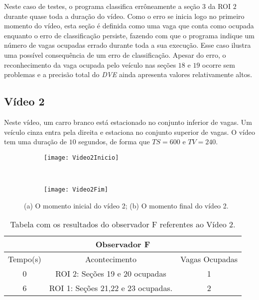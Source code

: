 Neste caso de testes, o programa classifica errôneamente a seção $3$ da ROI $2$ durante quase toda a duração do vídeo. Como o erro se inicia logo no primeiro momento do vídeo, esta seção é definida como uma vaga que conta como ocupada enquanto o erro de classificação persiste, fazendo com que o programa indique um número de vagas ocupadas errado durante toda a sua execução. Esse caso ilustra uma possível consequência de um erro de classificação. Apesar do erro, o reconhecimento da vaga ocupada pelo veículo nas seções $18$ e $19$ ocorre sem problemas e a precisão total do \textit{DVE} ainda apresenta valores relativamente altos.

\subsection{Vídeo 2}

Neste vídeo, um carro branco está estacionado no conjunto inferior de vagas. Um veículo cinza entra pela direita e estaciona no conjunto superior de vagas. O vídeo tem uma duração de $10$ segundos, de forma que $TS = 600$ e $TV = 240$.

\begin{figure}[H]
\centering
\begin{subfigure}{.5\textwidth}
\centering
\texttt{[image: Video2Inicio]}
\caption{}
\end{subfigure}\
\begin{subfigure}{.5\textwidth}
\centering
\texttt{[image: Video2Fim]}
\caption{}
\end{subfigure}
\centering
\caption{(a) O momento inicial do vídeo 2; (b) O momento final do vídeo 2.}%
\label{}%
\end{figure}

\begin{table}[H]
\begin{center}
\begin{tabular}{|c||c||c|}
\hline
\multicolumn{3}{|c|}{Observador F}  \\ \hline \hline
Tempo(s) & Acontecimento & Vagas Ocupadas\\ \hline
0 & ROI 2: Seções 19 e 20 ocupadas & 1 \\ \hline
6 & ROI 1: Seções 21,22 e 23 ocupadas. & 2 \\
\hline
\end{tabular}
\end{center}
\caption{Tabela com os resultados do observador F referentes ao Vídeo 2.}
\label{tab:video2F}
\end{table}

